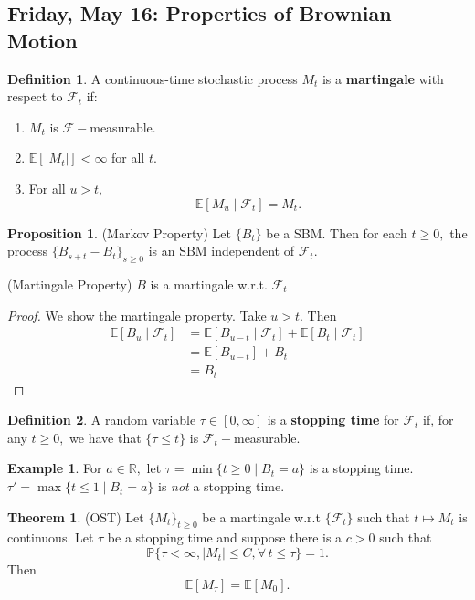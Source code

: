 \documentclass[10pt, oneside]{article}
\newcommand{\bbR}{\mathbb{R}}
\newcommand{\bbP}{\mathbb{P}}
\newcommand{\bbE}{\mathbb{E}}
\theoremstyle{definition}
\newtheorem{exmp}{Example}[section]
\newtheorem{thm}{Theorem}
\newtheorem{defn}{Definition}
\newtheorem{prop}{Proposition}
\begin{document}
\newpage
\subsection*{Friday, May 16: Properties of Brownian Motion}
\begin{defn}
    A continuous-time stochastic process $M_t$ is a \textbf{martingale} with respect to $\mathcal{F}_t$ if:
    \begin{enumerate}
        \item $M_t$ is $\mathcal{F}-$measurable.
        \item $\bbE[|M_t|] < \infty$ for all $t.$
        \item For all $u >t,$ 
        \[\bbE[M_u \mid \mathcal{F}_t] = M_t.\]
    \end{enumerate}
\end{defn}
\begin{prop}
    (Markov Property) Let $\{B_t\}$ be a SBM. Then for each $t\geq 0,$ the process $\{B_{s + t} - B_t\}_{s\geq 0}$ is an SBM independent of $\mathcal{F}_t.$ 

    (Martingale Property) $B$ is a martingale w.r.t. $\mathcal{F}_t$
\end{prop}
\begin{proof}
    We show the martingale property. Take $u>t.$ Then 
    \begin{align*}
        \bbE[B_u \mid \mathcal{F}_t] &= \bbE[B_{u-t} \mid \mathcal{F}_t] + \bbE[B_t \mid \mathcal{F}_t]\\
        &= \bbE[B_{u-t}] + B_t\\
        &= B_t
    \end{align*}
\end{proof}

\begin{defn}
    A random variable $\tau \in [0, \infty]$ is a \textbf{stopping time} for $\mathcal{F}_t$ if, for any $t\geq 0,$ we have that $\{\tau \leq t\}$ is $\mathcal{F}_t-$measurable. 
\end{defn}
\begin{exmp}
    For $a\in \bbR,$ let $\tau = \min\{t \geq 0 \mid B_t = a\}$ is a stopping time. $\tau' = \max\{t\leq 1 \mid B_t= a\}$ is \textit{not} a stopping time.
\end{exmp}

\begin{thm}
    (OST) Let $\{M_t\}_{t\geq 0}$ be a martingale w.r.t $\{\mathcal{F}_t\}$ such that $t\mapsto M_t$ is continuous. Let $\tau$ be a stopping time and suppose there is a $c>0$ such that 
    \[\bbP\{\tau < \infty, |M_t| \leq C, \forall\,t\leq \tau\} = 1.\] Then 
    \[\bbE[M_\tau] = \bbE[M_0].\]
\end{thm}
\end{document}

